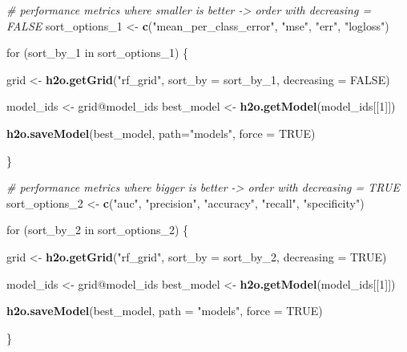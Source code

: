 \documentclass[]{article}
\newenvironment{Shaded}{\begin{snugshade}}{\end{snugshade}}
\newcommand{\KeywordTok}[1]{\textcolor[rgb]{0.13,0.29,0.53}{\textbf{{#1}}}}
\newcommand{\DataTypeTok}[1]{\textcolor[rgb]{0.13,0.29,0.53}{{#1}}}
\newcommand{\DecValTok}[1]{\textcolor[rgb]{0.00,0.00,0.81}{{#1}}}
\newcommand{\StringTok}[1]{\textcolor[rgb]{0.31,0.60,0.02}{{#1}}}
\newcommand{\CommentTok}[1]{\textcolor[rgb]{0.56,0.35,0.01}{\textit{{#1}}}}
\newcommand{\OtherTok}[1]{\textcolor[rgb]{0.56,0.35,0.01}{{#1}}}
\newcommand{\NormalTok}[1]{{#1}}
\begin{document}
\begin{Shaded}
\begin{Highlighting}[]
\CommentTok{# performance metrics where smaller is better -> order with decreasing = FALSE}
\NormalTok{sort_options_1 <-}\StringTok{ }\KeywordTok{c}\NormalTok{(}\StringTok{"mean_per_class_error"}\NormalTok{, }\StringTok{"mse"}\NormalTok{, }\StringTok{"err"}\NormalTok{, }\StringTok{"logloss"}\NormalTok{)}

\NormalTok{for (sort_by_1 in sort_options_1) \{}
  
  \NormalTok{grid <-}\StringTok{ }\KeywordTok{h2o.getGrid}\NormalTok{(}\StringTok{"rf_grid"}\NormalTok{, }\DataTypeTok{sort_by =} \NormalTok{sort_by_1, }\DataTypeTok{decreasing =} \OtherTok{FALSE}\NormalTok{)}
  
  \NormalTok{model_ids <-}\StringTok{ }\NormalTok{grid@model_ids}
  \NormalTok{best_model <-}\StringTok{ }\KeywordTok{h2o.getModel}\NormalTok{(model_ids[[}\DecValTok{1}\NormalTok{]])}
  
  \KeywordTok{h2o.saveModel}\NormalTok{(best_model, }\DataTypeTok{path=}\StringTok{"models"}\NormalTok{, }\DataTypeTok{force =} \OtherTok{TRUE}\NormalTok{)}
  
\NormalTok{\}}


\CommentTok{# performance metrics where bigger is better -> order with decreasing = TRUE}
\NormalTok{sort_options_2 <-}\StringTok{ }\KeywordTok{c}\NormalTok{(}\StringTok{"auc"}\NormalTok{, }\StringTok{"precision"}\NormalTok{, }\StringTok{"accuracy"}\NormalTok{, }\StringTok{"recall"}\NormalTok{, }\StringTok{"specificity"}\NormalTok{)}

\NormalTok{for (sort_by_2 in sort_options_2) \{}
  
  \NormalTok{grid <-}\StringTok{ }\KeywordTok{h2o.getGrid}\NormalTok{(}\StringTok{"rf_grid"}\NormalTok{, }\DataTypeTok{sort_by =} \NormalTok{sort_by_2, }\DataTypeTok{decreasing =} \OtherTok{TRUE}\NormalTok{)}
  
  \NormalTok{model_ids <-}\StringTok{ }\NormalTok{grid@model_ids}
  \NormalTok{best_model <-}\StringTok{ }\KeywordTok{h2o.getModel}\NormalTok{(model_ids[[}\DecValTok{1}\NormalTok{]])}
  
  \KeywordTok{h2o.saveModel}\NormalTok{(best_model, }\DataTypeTok{path =} \StringTok{"models"}\NormalTok{, }\DataTypeTok{force =} \OtherTok{TRUE}\NormalTok{)}
  
\NormalTok{\}}
\end{Highlighting}
\end{Shaded}
\end{document}
